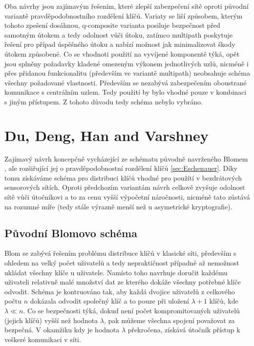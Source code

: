 \documentclass[11pt,final,twoside]{fithesis2}
\begin{document}
Oba návrhy jsou zajímavým řešením, které zlepší zabezpečení sítě oproti původní variantě pravděpodobnostního rozdělení klíčů. Variaty se liší způsobem, kterým tohoto zpešení dosáhnou, q-composite 
varianta posiluje bezpečnost před samotným útokem a tedy odolnost vůči útoku, zatímco multipath poskytuje řešení pro případ úspěšného útoku a nabízí možnost jak minimalizovat škody útokem způsobené.
Co se vhodnoti použití na vyvíjené komponentě týká, opět jsou splněny požadavky kladené omezeným výkonem jednotlivých uzlů, nicméně i přes přidanou funkcionalitu (především ve 
variantě multipath) neobsahuje schéma všechny požadované vlastnosti. Především se nezabývá zabezpečením oboustrané komunikace s centrálním uzlem. Tedy použití by bylo vhodné pouze v kombinaci 
s jiným přístupem. Z tohoto důvodu tedy schéma nebylo vybráno. 


\section{Du, Deng, Han and Varshney}
Zajímavý návrh \cite{Du2005} koncepčně vycházející ze schématu původně navrženého Blomem \cite{Blom1985}, ale rozšiřující jej o pravděpodobnostní rozdělení klíčů \ref{sec:Eschenauer}.
Díky tomu získáváme schéma pro distribuci klíčů vhodné pro použítí v bezdrátových sensorových sítích. Oproti předchozím variantám návrh celkově zvyšuje odolnost sítě vůči 
útočníkovi a to za cenu vyšší výpočetní náročnosti, nicméně tato zůstává na rozumné míře (tedy stále výrazně menší než u asymetrické kryptografie). 

\subsection{Původní Blomovo schéma}
Blom \cite{Blom1985} se zabývá řešením problému distribuce klíčů v klasické síti, především s ohledem na velký počet uživatelů a tedy nepraktičnost případně až nemožnost ukládat všechny klíče u uživatele.
Namísto toho navrhuje doručit každému uživateli relativně malé množství dat ze kterého dokáže všechny potřebné klíče odvodit. Schéma je kontruováno tak, aby každá dvojice uživatelů z celkového počtu $n$
dokázala odvodit společný klíč a to pouze při uložení $\lambda + 1$ klíčů, kde $\lambda \ll n$. Co se bezpečnosti týká, dokud není počet kompromitovaných uživatelů (jejich klíčů) vyšší než hodnota 
$\lambda$, pak můžeme všechna spojení považovat za bezpečná. V okamžiku kdy je hodnota $\lambda$ překročena, získává útočník přístup k veškeré komunikaci v síti. 
\end{document}
